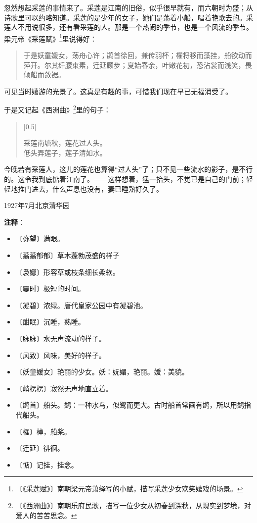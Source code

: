 \documentclass[12pt,UTF-8,openany]{ctexbook}
\begin{document}
\begin{large}
    忽然想起采莲的事情来了。采莲是江南的旧俗，似乎很早就有，而六朝时为盛；从诗歌里可以约略知道。采莲的是少年的女子，她们是荡着小船，唱着艳歌去的。采莲人不用说很多，还有看采莲的人。那是一个热闹的季节，也是一个风流的季节。梁元帝《采莲赋》\footnote{〔《采莲赋》〕南朝梁元帝萧绎写的小赋，描写采莲少女欢笑嬉戏的场景。}里说得好：
    
    \begin{quotation}
    
    于是妖童媛女，荡舟心许；鹢首徐回，兼传羽杯；櫂将移而藻挂，船欲动而萍开。尔其纤腰束素，迁延顾步；夏始春余，叶嫩花初，恐沾裳而浅笑，畏倾船而敛裾。
    
    \end{quotation}
    
    可见当时嬉游的光景了。这真是有趣的事，可惜我们现在早已无福消受了。
    
    于是又记起《西洲曲》\footnote{〔《西洲曲》〕南朝乐府民歌，描写一位少女从初春到深秋，从现实到梦境，对爱人的苦苦思念。}里的句子：
    
    \begin{verse}[0.5\linewidth]
    
    采莲南塘秋，莲花过人头。\\低头弄莲子，莲子清如水。
    
    \end{verse}
    
    今晚若有采莲人，这儿的莲花也算得“过人头”了；只不见一些流水的影子，是不行的。这令我到底惦着江南了。——这样想着，猛一抬头，不觉已是自己的门前；轻轻地推门进去，什么声息也没有，妻已睡熟好久了。
    
    \hfill 1927年7月北京清华园
    
\end{large}


\newpage

\textbf{注释}：

\vspace{-1em}

\begin{itemize}
    \setlength\itemsep{-0.2em}
    \item 〔弥望〕满眼。
    \item 〔蓊蓊郁郁〕草木蓬勃茂盛的样子
    \item 〔袅娜〕形容草或枝条细长柔软。
    \item 〔霎时〕极短的时间。
    \item 〔凝碧〕浓绿。唐代皇家公园中有凝碧池。
    \item 〔酣眠〕沉睡，熟睡。
    \item 〔脉脉〕水无声流动的样子。
    \item 〔风致〕风味，美好的样子。
    \item 〔妖童媛女〕艳丽的少女。妖：妩媚，艳丽。媛：美貌。
    \item 〔峭楞楞〕寂然无声地直立着。
    \item 〔鹢首〕船头。鹢：一种水鸟，似鹭而更大。古时船首常画有鹢，所以用鹢指代船头。
    \item 〔櫂〕棹，船桨。
    \item 〔迁延〕徘徊。
    \item 〔惦〕记挂，挂念。
\end{itemize}
\end{document}
